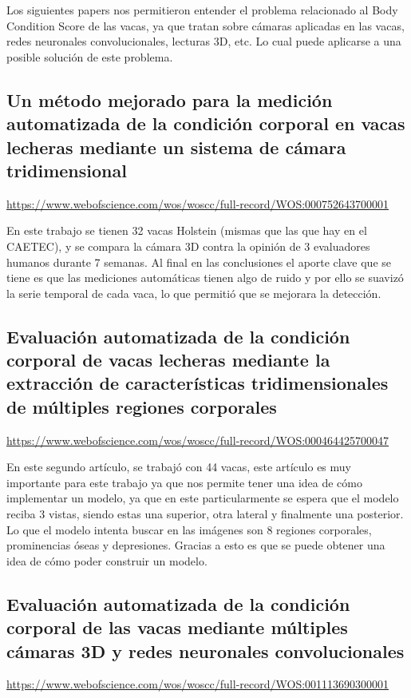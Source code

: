 \documentclass[11pt,letterpaper,DIV=12]{scrartcl}
\begin{document}
Los siguientes papers nos permitieron entender el problema relacionado al Body Condition Score de las vacas, ya que tratan sobre cámaras aplicadas en las vacas, redes neuronales convolucionales, lecturas 3D, etc. Lo cual puede aplicarse a una posible solución de este problema.

\subsection{Un método mejorado para la medición automatizada de la condición corporal en vacas lecheras mediante un sistema de cámara tridimensional}

\url{https://www.webofscience.com/wos/woscc/full-record/WOS:000752643700001}

En este trabajo se tienen 32 vacas Holstein (mismas que las que hay en el CAETEC), y se compara la cámara 3D contra la opinión de 3 evaluadores humanos durante 7 semanas. Al final en las conclusiones el aporte clave que se tiene es que las mediciones automáticas tienen algo de ruido y por ello se suavizó la serie temporal de cada vaca, lo que permitió que se mejorara la detección.

\subsection{Evaluación automatizada de la condición corporal de vacas lecheras mediante la extracción de características tridimensionales de múltiples regiones corporales}

\url{https://www.webofscience.com/wos/woscc/full-record/WOS:000464425700047}

En este segundo artículo, se trabajó con 44 vacas, este artículo es muy importante para este trabajo ya que nos permite tener una idea de cómo implementar un modelo, ya que en este particularmente se espera que el modelo reciba 3 vistas, siendo estas una superior, otra lateral y finalmente una posterior. Lo que el modelo intenta buscar en las imágenes son 8 regiones corporales, prominencias óseas y depresiones. Gracias a esto es que se puede obtener una idea de cómo poder construir un modelo.

\subsection{Evaluación automatizada de la condición corporal de las vacas mediante múltiples cámaras 3D y redes neuronales convolucionales}

\url{https://www.webofscience.com/wos/woscc/full-record/WOS:001113690300001}
\end{document}
